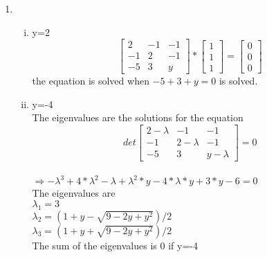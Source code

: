 \documentclass[12pt]{article}
\begin{document}
\begin{enumerate}[1)]
    \item
        \begin{enumerate}[(i)]
            \item 
                y=2\\$$\begin{bmatrix}2&-1&-1\\-1&2&-1\\-5&3&y\end{bmatrix}*\begin{bmatrix}1\\1\\1\end{bmatrix}=\begin{bmatrix}0\\0\\0\end{bmatrix}$$
                the equation is solved when $-5+3+y=0$ is solved.
            \item
                y=-4\\
                The eigenvalues are the solutions for the equation $$det\begin{bmatrix}2-\lambda&-1&-1\\-1&2-\lambda&-1\\-5&3&y-\lambda\end{bmatrix}=0$$\\$\Rightarrow-\lambda^3+4*\lambda^2-\lambda+\lambda^2*y-4*\lambda*y+3*y-6=0$\\
                The eigenvalues are \\
                $\lambda_{1} = 3$\\
                $\lambda_{2} = (1+y-\sqrt{9-2y+y^2})/2$\\
                $\lambda_{3} = (1+y+\sqrt{9-2y+y^2})/2$\\
                The sum of the eigenvalues is 0 if y=-4\\
        \end{enumerate}
\end{enumerate}

\newpage
\end{document}

